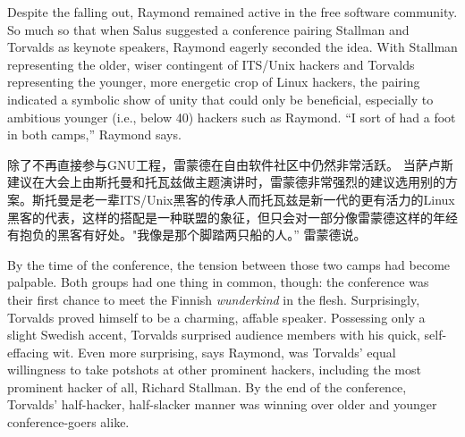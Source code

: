 \ifdefined\eng
Despite the falling out, Raymond remained active in the free software community. So much so that when Salus suggested a conference pairing Stallman and Torvalds as keynote speakers, Raymond eagerly seconded the idea. With Stallman representing the older, wiser contingent of ITS/Unix hackers and Torvalds representing the younger, more energetic crop of Linux hackers, the pairing indicated a symbolic show of unity that could only be beneficial, especially to ambitious younger (i.e., below 40) hackers such as Raymond. ``I sort of had a foot in both camps,'' Raymond says.
\fi

\ifdefined\chs
除了不再直接参与GNU工程，雷蒙德在自由软件社区中仍然非常活跃。 当萨卢斯建议在大会上由斯托曼和托瓦兹做主题演讲时，雷蒙德非常强烈的建议选用别的方案。斯托曼是老一辈ITS/Unix黑客的传承人而托瓦兹是新一代的更有活力的Linux黑客的代表，这样的搭配是一种联盟的象征，但只会对一部分像雷蒙德这样的年经有抱负的黑客有好处。"我像是那个脚踏两只船的人。” 雷蒙德说。
\fi

\ifdefined\eng
By the time of the conference, the tension between those two camps had become palpable. Both groups had one thing in common, though: the conference was their first chance to meet the Finnish \textit{wunderkind} in the flesh. Surprisingly, Torvalds proved himself to be a charming, affable speaker. Possessing only a slight Swedish accent, Torvalds surprised audience members with his quick, self-effacing wit. Even more surprising, says Raymond, was Torvalds' equal willingness to take potshots at other prominent hackers, including the most prominent hacker of all, Richard Stallman. By the end of the conference, Torvalds' half-hacker, half-slacker manner was winning over older and younger conference-goers alike.
\fi

